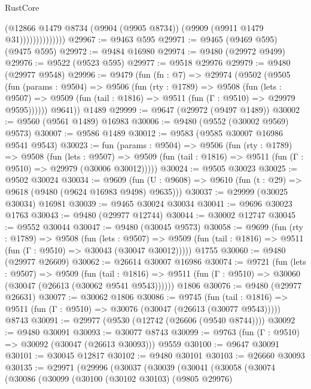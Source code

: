 \begin{lexlean}{RustCore}
\begin{coremodule}
                          (@12866
                            @1479
                            @8734
                            (@9904 (@9905 @8734))
                            (@9909 (@9911 @1479 @31))))))))))))))
@29967 := @9463 @595
@29971 := @9465 (@9469 @595) (@9475 @595)
@29972 := @9484 @16980
@29974 := @9480 (@29972 @9499)
@29976 := @9522 (@9523 @595)
@29977 := @9518 @29976
@29979 := @9480 (@29977 @9548)
@29996 := @9479
    (fun (fn : @7) =>
    @29974
      (@9502
        (@9505
          (fun (params : @9504) =>
          @9506
            (fun (rty : @1789) =>
            @9508
              (fun (lets : @9507) =>
              @9509 (fun (tail : @1816) => @9511 (fun (Γ : @9510) => @29979 @9595))))))
        @9641))
    @1489
@29999 := @9647 (@29972 (@9497 @1489))
@30002 := @9560 (@9561 @1489) @16983
@30006 := @9480 (@9552 (@30002 @9569) @9573)
@30007 := @9586 @1489
@30012 := @9583 (@9585 @30007 @16986 @9541 @9543)
@30023 := fun (params : @9504) =>
  @9506
    (fun (rty : @1789) =>
    @9508
      (fun (lets : @9507) =>
      @9509 (fun (tail : @1816) => @9511 (fun (Γ : @9510) => @29979 (@30006 @30012)))))
@30024 := @9505 @30023
@30025 := @9502 @30024
@30034 := @9609
    (fun (U : @9608) => @9610 (fun (t : @29) => @9618 (@9480 (@9624 @16983 @9498) @9635)))
@30037 := @29999 (@30025 @30034) @16981
@30039 := @9465 @30024 @30034
@30041 := @9696 @30023 @1763
@30043 := @9480 (@29977 @12744)
@30044 := @30002 @12747
@30045 := @9552 @30044
@30047 := @9480 (@30045 @9573)
@30058 := @9699
    (fun (rty : @1789) =>
    @9508
      (fun (lets : @9507) =>
      @9509 (fun (tail : @1816) => @9511 (fun (Γ : @9510) => @30043 (@30047 @30012)))))
    @1755
@30060 := @9480 (@29977 @26609)
@30062 := @26614 @30007 @16986
@30074 := @9721
    (fun (lets : @9507) =>
    @9509
      (fun (tail : @1816) =>
      @9511 (fun (Γ : @9510) => @30060 (@30047 (@26613 (@30062 @9541 @9543))))))
    @1806
@30076 := @9480 (@29977 @26631)
@30077 := @30062 @1806
@30086 := @9745
    (fun (tail : @1816) => @9511 (fun (Γ : @9510) => @30076 (@30047 (@26613 (@30077 @9543)))))
    @8743
@30091 := @29977 (@9530 (@12742 (@26606 (@9540 @8744))))
@30092 := @9480 @30091
@30093 := @30077 @8743
@30099 := @9763 (fun (Γ : @9510) => @30092 (@30047 (@26613 @30093))) @9559
@30100 := @9647 @30091
@30101 := @30045 @12817
@30102 := @9480 @30101
@30103 := @26660 @30093
@30135 := @29971
    (@29996
      (@30037
        (@30039
          (@30041
            (@30058
              (@30074
                (@30086
                  (@30099
                    (@30100
                      (@30102 @30103)
                      (@9805 @29976)

\end{coremodule}
\end{lexlean}
